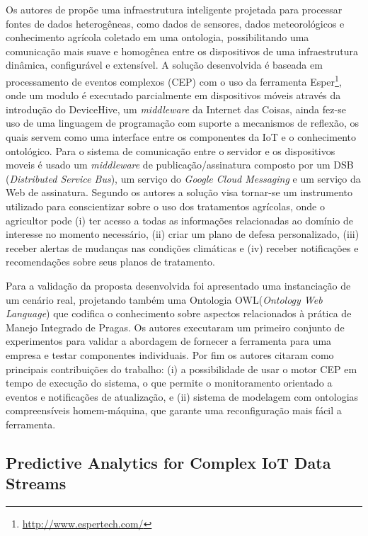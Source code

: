 \documentclass[ti,table]{texufpel} %
\begin{document}
	Os autores de \cite{art3nocera2017semantic} propõe uma infraestrutura inteligente projetada para processar fontes de dados heterogêneas, como dados de sensores, dados meteorológicos e conhecimento agrícola coletado em uma ontologia, possibilitando uma comunicação mais suave e homogênea entre os dispositivos de uma infraestrutura dinâmica, configurável e extensível. A solução desenvolvida é baseada em processamento de eventos complexos (CEP) com o uso da ferramenta Esper\footnote{\url{http://www.espertech.com/}}, onde um modulo é executado parcialmente em dispositivos móveis através da introdução do DeviceHive, um \textit{middleware} da Internet das Coisas, ainda fez-se uso de uma linguagem de programação com suporte a mecanismos de reflexão, os quais servem como uma interface entre os componentes da IoT e o conhecimento ontológico. Para o sistema de comunicação entre o servidor e os dispositivos moveis é usado um \textit{middleware} de publicação/assinatura composto por um DSB (\textit{Distributed Service Bus}), um serviço do \textit{Google Cloud Messaging} e um serviço da Web de assinatura. Segundo os autores a solução visa tornar-se um instrumento utilizado para conscientizar sobre o uso dos tratamentos agrícolas, onde o agricultor pode (i) ter acesso a todas as informações relacionadas ao domínio de interesse no momento necessário, (ii) criar um plano de defesa personalizado, (iii) receber alertas de mudanças nas condições climáticas e (iv) receber notificações e recomendações sobre seus planos de tratamento.
	
	Para a validação da proposta desenvolvida foi apresentado uma instanciação de um cenário real, projetando também uma Ontologia OWL(\textit{Ontology Web Language}) que codifica o conhecimento sobre aspectos relacionados à prática de Manejo Integrado de Pragas. Os autores executaram um primeiro conjunto de experimentos para validar a abordagem de fornecer a ferramenta para uma empresa e testar componentes individuais. Por fim os autores citaram como principais contribuições do trabalho: (i) a possibilidade de usar o motor CEP em tempo de execução do sistema, o que permite o monitoramento orientado a eventos e notificações de atualização, e (ii) sistema de modelagem com ontologias compreensíveis homem-máquina, que garante uma reconfiguração mais fácil a ferramenta. 
	


\subsection{Predictive Analytics for Complex IoT Data Streams}
\end{document}

